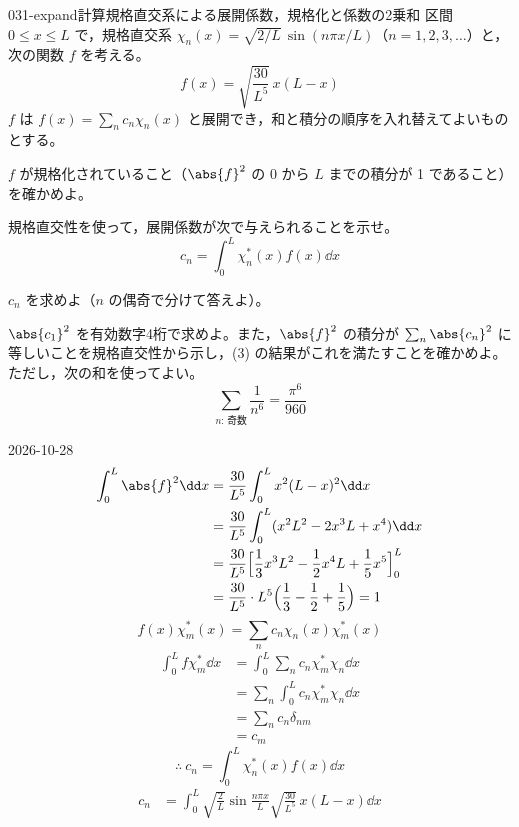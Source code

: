 \documentclass[uplatex,dvipdfmx,a4paper,11pt]{jsarticle}
\begin{document}
\begin{mondai}{031-expand}{計算}{規格直交系による展開係数，規格化と係数の2乗和}
区間 $0\le x\le L$ で，規格直交系 $\chi_{n}(x)=\sqrt{2/L}\,\sin(n\pi x/L)$（$n=1,2,3,\dots$）と，次の関数 $f$ を考える。
  \[ f(x)=\sqrt{\frac{30}{L^{5}}}\,x(L-x) \]
  $f$ は $f(x)=\sum_{n}c_{n}\chi_{n}(x)$ と展開でき，和と積分の順序を入れ替えてよいものとする。
  \begin{shoumon}
    \item $f$ が規格化されていること（$\abs{f}^{2}$ の $0$ から $L$ までの積分が 1 であること）を確かめよ。
    \item 規格直交性を使って，展開係数が次で与えられることを示せ。
    \[ c_{n}=\int_{0}^{L}\chi_{n}^{*}(x)f(x)\dd x \]
    \item $c_{n}$ を求めよ（$n$ の偶奇で分けて答えよ）。
    \item $\abs{c_{1}}^{2}$ を有効数字4桁で求めよ。また，$\abs{f}^{2}$ の積分が $\sum_{n}\abs{c_{n}}^{2}$ に等しいことを規格直交性から示し，(3) の結果がこれを満たすことを確かめよ。ただし，次の和を使ってよい。
    \[ \sum_{n:\,\text{奇数}}\frac{1}{n^{6}}=\frac{\pi^{6}}{960} \]
  \end{shoumon}
\begin{kotaeutsushi}{2026-10-28}
\begin{align*}
\int_{0}^{L}\abs{f}^{2}\dd x&=\frac{30}{L^{5}}\int_{0}^{L}x^{2}(L-x)^{2}\dd x\\
&=\frac{30}{L^{5}}\int_{0}^{L}(x^{2}L^{2}-2x^{3}L+x^{4})\dd x\\
&=\frac{30}{L^{5}}\Bigl[\frac{1}{3}x^{3}L^{2}-\frac{1}{2}x^{4}L+\frac{1}{5}x^{5}\Bigr]_{0}^{L}\\
&=\frac{30}{L^{5}}\cdot L^{5}\Bigl(\frac{1}{3}-\frac{1}{2}+\frac{1}{5}\Bigr)=1
\end{align*}
\[ f(x)\chi_{m}^{*}(x)=\sum_{n}c_{n}\chi_{n}(x)\chi_{m}^{*}(x) \]
\begin{align*}
\int_{0}^{L}f\chi_{m}^{*}\dd x&=\int_{0}^{L}\sum_{n}c_{n}\chi_{m}^{*}\chi_{n}\dd x\\
&=\sum_{n}\int_{0}^{L}c_{n}\chi_{m}^{*}\chi_{n}\dd x\\
&=\sum_{n}c_{n}\delta_{nm}\\
&=c_{m}
\end{align*}
\[ \therefore\ c_{n}=\int_{0}^{L}\chi_{n}^{*}(x)f(x)\dd x \]
\begin{align*}
c_{n}&=\int_{0}^{L}\sqrt{\frac{2}{L}}\sin\frac{n\pi x}{L}\sqrt{\frac{30}{L^{5}}}\,x(L-x)\dd x\\

\end{align*}
\end{kotaeutsushi}
\end{mondai}
\end{document}
